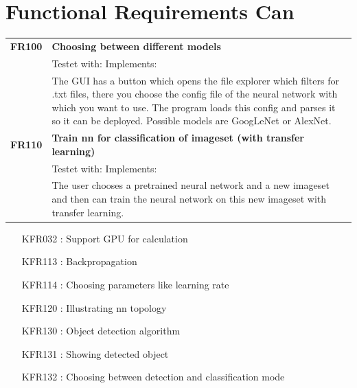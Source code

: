 \documentclass[parskip=full]{scrartcl}
\begin{document}
\section{Functional Requirements Can}
\begin{tabular}{p{2cm}p{12cm}}
\textbf{FR100} & \textbf{Choosing between different models}\\
& Testet with: Implements: \\
& The GUI has a button which opens the file explorer which filters for .txt files, there you choose the config file of the neural network with which you want to use. The program loads this config and parses it so it can be deployed. Possible models are GoogLeNet or AlexNet.\\
\textbf{FR110} & \textbf{Train nn for classification of imageset (with transfer learning)}\\
& Testet with: Implements: \\
& The user chooses a pretrained neural network and a new imageset and then can train the neural network on this new imageset with transfer learning.\\


\end{tabular}
\begin{itemize}[nosep]
\item [KFR032]: Support GPU for calculation
\item [KFR113]: Backpropagation
\item [KFR114]: Choosing parameters like learning rate
\item [KFR120]: Illustrating nn topology
\item [KFR130]: Object detection algorithm
\item [KFR131]: Showing detected object
\item [KFR132]: Choosing between detection and classification mode

\end{itemize}
\end{document}
